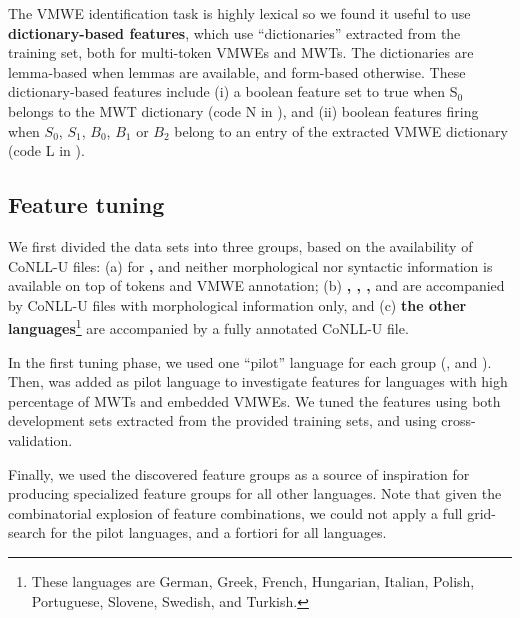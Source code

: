 \documentclass[output=paper,modfonts]{langscibook}
\begin{document}
The VMWE identification task is highly lexical so we found it useful to use \textbf{dictionary-based features}, which use ``dictionaries'' extracted from the training set, both for multi-token VMWEs and MWTs. The dictionaries are lemma-based when lemmas are available, and form-based otherwise. These dictionary-based features include (i) a boolean feature set to true when S$_0$ belongs to the MWT dictionary (code N in  ), and (ii) boolean features firing when $S_0$, $S_1$, $B_0$, $B_1$ or $B_2$ belong to an entry of the extracted VMWE dictionary (code L in ).
\subsection{Feature tuning}
\label{ss:tuning}
We first divided the data sets into three groups, based on the availability of CoNLL-U files: (a) for \textbf{, } and \textbf{} neither morphological nor syntactic information is available on top of tokens and VMWE annotation; (b) \textbf{, , , } and \textbf{} are accompanied by CoNLL-U files with morphological information only, and (c) \textbf{the other languages}\footnote{These languages are German, Greek, French, Hungarian, Italian, Polish, Portuguese, Slovene, Swedish, and Turkish.} 
are accompanied by a fully annotated CoNLL-U file. 

In the first tuning phase, we used one ``pilot'' language for each group (,  and ). Then,  was added as pilot language to investigate features for languages with high percentage of MWTs and embedded VMWEs. We tuned the features using both development sets extracted from the provided training sets, and using cross-validation.

Finally, we used the discovered feature groups as a source of inspiration for producing specialized feature groups for all other languages. Note that given the combinatorial explosion of feature combinations, we could not apply a full grid-search for the pilot languages, and a fortiori for all languages.
\end{document}
